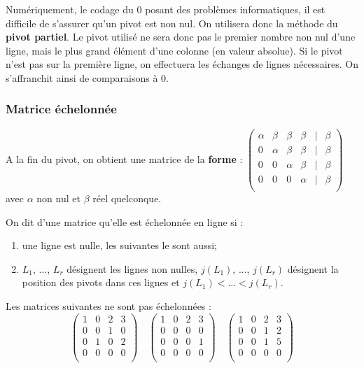 \begin{remarque}
Numériquement, le codage du 0 posant des problèmes informatiques, il est difficile de s'assurer qu'un pivot est non nul. On utilisera donc la méthode du \textbf{pivot partiel}. Le pivot utilisé ne sera donc pas le premier nombre non nul d'une ligne, mais le plus grand élément d'une colonne (en valeur absolue). Si le pivot n'est pas sur la première ligne, on effectuera les échanges de lignes nécessaires. On s'affranchit ainsi de comparaisons à 0. 

\end{remarque}
\subsubsection{Matrice échelonnée}
A la fin du pivot, on obtient une matrice de la \textbf{forme} :
$
\begin{pmatrix}
\alpha &\beta & \beta & \beta &  | &\beta \\
0  & \alpha & \beta  &  \beta   &  | & \beta \\
0 & 0 &   \alpha& \beta &  | &\beta  \\
0 & 0 & 0 & \alpha &   | &\beta\\
\end{pmatrix}$
 avec $\alpha$ non nul et $\beta$ réel quelconque.

\begin{defi}
On dit d'une matrice qu'elle est échelonnée en ligne si :
\begin{enumerate}
\item une ligne est nulle, les suivantes le sont aussi;
\item $L_1$, ..., $L_r$ désignent les lignes non nulles, $j(L_1)$, ..., $j(L_r)$ désignent la position des pivots dans ces lignes et $j(L_1)<...<j(L_r)$. 
\end{enumerate}
\end{defi}

\begin{exemple}
Les matrices suivantes ne sont pas échelonnées : 
$$
\begin{pmatrix}
1 & 0 & 2 & 3\\
0 & 0 & 1 & 0\\
0 & 1 & 0 & 2\\
0 & 0 & 0 & 0\\
\end{pmatrix}
\quad
\begin{pmatrix}
1 & 0 & 2 & 3\\
0 & 0 & 0 & 0\\
0 & 0 & 0 & 1\\
0 & 0 & 0 & 0\\
\end{pmatrix}
\quad
\begin{pmatrix}
1 & 0 & 2 & 3\\
0 & 0 & 1 & 2\\
0 & 0 & 1 & 5\\
0 & 0 & 0 & 0\\
\end{pmatrix}
$$
\end{exemple}

